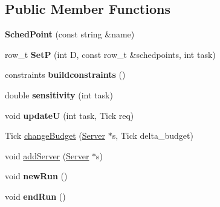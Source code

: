 \subsection*{Public Member Functions}
\begin{DoxyCompactItemize}
\item 
{\bfseries Sched\+Point} (const string \&name)\hypertarget{classRTSim_1_1SchedPoint_ae3f37d54760ff565dedbd3c7776e507f}{}\label{classRTSim_1_1SchedPoint_ae3f37d54760ff565dedbd3c7776e507f}

\item 
row\+\_\+t {\bfseries SetP} (int D, const row\+\_\+t \&schedpoints, int task)\hypertarget{classRTSim_1_1SchedPoint_a5eef1beb4856f62a2a1d00bb998f3eff}{}\label{classRTSim_1_1SchedPoint_a5eef1beb4856f62a2a1d00bb998f3eff}

\item 
constraints {\bfseries buildconstraints} ()\hypertarget{classRTSim_1_1SchedPoint_a2bdd83cbd66b82fbecee9181554a3dc6}{}\label{classRTSim_1_1SchedPoint_a2bdd83cbd66b82fbecee9181554a3dc6}

\item 
double {\bfseries sensitivity} (int task)\hypertarget{classRTSim_1_1SchedPoint_aca1bd4b8a1b82d2ca8aa6531ba23553f}{}\label{classRTSim_1_1SchedPoint_aca1bd4b8a1b82d2ca8aa6531ba23553f}

\item 
void {\bfseries updateU} (int task, Tick req)\hypertarget{classRTSim_1_1SchedPoint_a77dfbc1adcbe7d02df4789bafe12ffa8}{}\label{classRTSim_1_1SchedPoint_a77dfbc1adcbe7d02df4789bafe12ffa8}

\item 
Tick \hyperlink{classRTSim_1_1SchedPoint_a9933d1676d8b5013267a55a5ae2568d5}{change\+Budget} (\hyperlink{classRTSim_1_1Server}{Server} $\ast$s, Tick delta\+\_\+budget)
\item 
void \hyperlink{classRTSim_1_1SchedPoint_a93de9c7aab7bb2c77e26f0e17937f8bc}{add\+Server} (\hyperlink{classRTSim_1_1Server}{Server} $\ast$s)
\item 
void {\bfseries new\+Run} ()\hypertarget{classRTSim_1_1SchedPoint_a9a43b71e150b1651e857f9e4e0f2730a}{}\label{classRTSim_1_1SchedPoint_a9a43b71e150b1651e857f9e4e0f2730a}

\item 
void {\bfseries end\+Run} ()\hypertarget{classRTSim_1_1SchedPoint_af8d29a4807b309c6d53e387c54159556}{}\label{classRTSim_1_1SchedPoint_af8d29a4807b309c6d53e387c54159556}

\end{DoxyCompactItemize}
